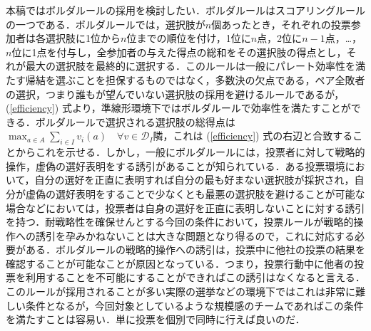 \documentclass[a4paper, 11pt]{jsarticle}
\begin{document}
本稿ではボルダルールの採用を検討したい．ボルダルールはスコアリングルールの一つである．ボルダルールでは，選択肢が\(n\)個あったとき，それぞれの投票参加者は各選択肢に1位から\(n\)位までの順位を付け，1位に\(n\)点，2位に\(n-1\)点，\dots ，\(n\)位に1点を付与し，全参加者の与えた得点の総和をその選択肢の得点とし，それが最大の選択肢を最終的に選択する．このルールは一般にパレート効率性を満たす帰結を選ぶことを担保するものではなく，多数決の欠点である，ペア全敗者の選択，つまり誰もが望んでいない選択肢の採用を避けるルールであるが， (\ref{efficiency}) 式より，準線形環境下ではボルダルールで効率性を満たすことができる．ボルダルールで選択される選択肢の総得点は\(\max_{a \in A}\sum_{i \in I}v_i(a) \quad \forall v \in \mathscr{D}_I\)隣，これは (\ref{efficiency}) 式の右辺と合致することからこれを示せる．しかし，一般にボルダルールには，投票者に対して戦略的操作，虚偽の選好表明をする誘引があることが知られている．ある投票環境において，自分の選好を正直に表明すれば自分の最も好まない選択肢が採択され，自分が虚偽の選好表明をすることで少なくとも最悪の選択肢を避けることが可能な場合などにおいては，投票者は自身の選好を正直に表明しないことに対する誘引を持つ．耐戦略性を確保せんとする今回の条件において，投票ルールが戦略的操作への誘引を孕みかねないことは大きな問題となり得るので，これに対応する必要がある．ボルダルールの戦略的操作への誘引は，投票中に他社の投票の結果を確認することが可能なことが原因となっている．つまり，投票行動中に他者の投票を利用することを不可能にすることができればこの誘引はなくなると言える．このルールが採用されることが多い実際の選挙などの環境下ではこれは非常に難しい条件となるが，今回対象としているような規模感のチームであればこの条件を満たすことは容易い．単に投票を個別で同時に行えば良いのだ．
\end{document}
